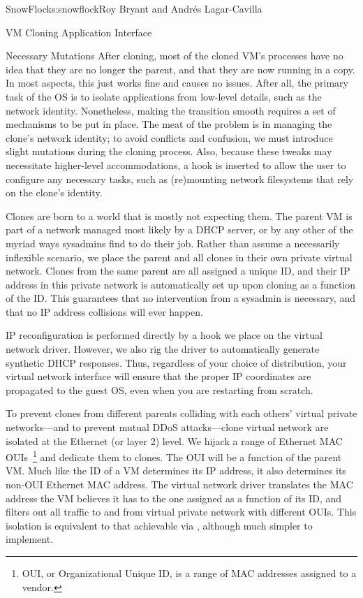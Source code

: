 \begin{aosachapter}{SnowFlock}{s:snowflock}{Roy Bryant and Andr\'e{s} Lagar-Cavilla}
\begin{aosasect1}{VM Cloning Application Interface}
\begin{aosasect2}{Necessary Mutations}
After cloning, most of the cloned VM's processes have no idea that
they are no longer the parent, and that they are now running in a
copy. In most aspects, this just works fine and causes no
issues. After all, the primary task of the OS is to isolate
applications from low-level details, such as the network identity.
Nonetheless, making the transition smooth requires a set of mechanisms
to be put in place. The meat of the problem is in managing the clone's
network identity; to avoid conflicts and confusion, we must introduce
slight mutations during the cloning process.  Also, because these
tweaks may necessitate higher-level accommodations, a hook is inserted
to allow the user to configure any necessary tasks, such as
(re)mounting network filesystems that rely on the clone's identity.

Clones are born to a world that is mostly not expecting them. The
parent VM is part of a network managed most likely by a DHCP server,
or by any other of the myriad ways sysadmins find to do their
job. Rather than assume a necessarily inflexible scenario, we place
the parent and all clones in their own private virtual network. Clones
from the same parent are all assigned a unique ID, and their IP
address in this private network is automatically set up upon cloning
as a function of the ID\@. This guarantees that no intervention from a
sysadmin is necessary, and that no IP address collisions will ever
happen.

IP reconfiguration is performed directly by a hook we place on the
virtual network driver. However, we also rig the driver to
automatically generate synthetic DHCP responses. Thus, regardless of
your choice of distribution, your virtual network interface will
ensure that the proper IP coordinates are propagated to the guest OS,
even when you are restarting from scratch.

To prevent clones from different parents colliding with each others'
virtual private networks---and to prevent mutual DDoS attacks---clone
virtual network are isolated at the Ethernet (or layer 2) level. We
hijack a range of Ethernet MAC OUIs~\footnote{OUI, or Organizational Unique ID,
is a range of MAC addresses assigned to a vendor.} and dedicate them to clones. The
OUI will be a function of the parent VM\@. Much like the ID of a VM
determines its IP address, it also determines its non-OUI Ethernet MAC
address.  The virtual network driver translates the MAC address the VM
believes it has to the one assigned as a function of its ID, and
filters out all traffic to and from virtual private network with
different OUIs. This isolation is equivalent to that achievable via
, although much simpler to implement.


\end{aosasect2}
\end{aosasect1}
\end{aosachapter}
